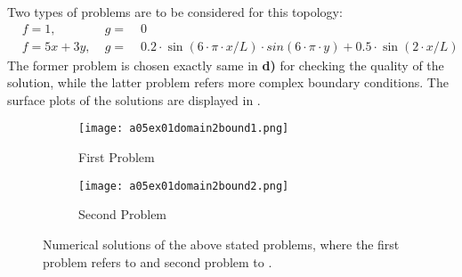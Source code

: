 %
Two types of problems are to be considered for this topology:
\begin{align}
	\label{eq:problem1}
	&f = 1, \;    	 & g = & \;0 \\
	\label{eq:problem2}
	&f = 5x + 3y, \; & g = & \; 0.2 \cdot \sin(6\cdot \pi \cdot x/L) \cdot sin(6 \cdot \pi \cdot y) + 0.5 \cdot \sin(2\cdot x/L)
\end{align}
The former problem is chosen exactly same in \textbf{d)} for checking the quality of the solution, while the latter problem refers more complex boundary conditions.
The surface plots of the solutions are displayed in .
%
\begin{figure}[H]
\vspace*{\FigUpperVSpace}
\def\MeshFigWidth{210pt}
	\begin{subfigure}[b]{0.5\hsize}
		\centering
		\texttt{[image: a05ex01domain2bound1.png]} 
		\caption{First Problem}
		\label{fig:a05ex01domain2bound1}
	\end{subfigure}
	\begin{subfigure}[b]{0.5\hsize}
		\centering
		\texttt{[image: a05ex01domain2bound2.png]} 
		\caption{Second Problem}
		\label{fig:a05ex01domain2bound2}
	\end{subfigure}
	\caption{Numerical solutions of the above stated problems, where the first problem refers to  and second problem to .}
	\label{fig:a05ex01f}
\end{figure}

%
%

%

%

%
%

%

%
%
